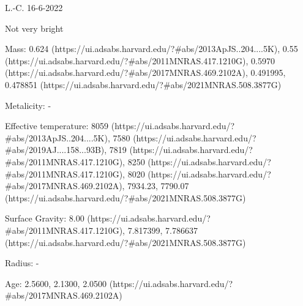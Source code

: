 L.-C.   16-6-2022

Not very bright

Mass:
0.624 (https://ui.adsabs.harvard.edu/?#abs/2013ApJS..204....5K),
0.55 (https://ui.adsabs.harvard.edu/?#abs/2011MNRAS.417.1210G),
0.5970 (https://ui.adsabs.harvard.edu/?#abs/2017MNRAS.469.2102A),
0.491995, 0.478851 (https://ui.adsabs.harvard.edu/?#abs/2021MNRAS.508.3877G)

Metalicity: -

Effective temperature:
8059 (https://ui.adsabs.harvard.edu/?#abs/2013ApJS..204....5K),
7580 (https://ui.adsabs.harvard.edu/?#abs/2019AJ....158...93B),
7819 (https://ui.adsabs.harvard.edu/?#abs/2011MNRAS.417.1210G),
8250 (https://ui.adsabs.harvard.edu/?#abs/2011MNRAS.417.1210G),
8020 (https://ui.adsabs.harvard.edu/?#abs/2017MNRAS.469.2102A),
7934.23, 7790.07 (https://ui.adsabs.harvard.edu/?#abs/2021MNRAS.508.3877G)

Surface Gravity:
8.00 (https://ui.adsabs.harvard.edu/?#abs/2011MNRAS.417.1210G),
7.817399, 7.786637 (https://ui.adsabs.harvard.edu/?#abs/2021MNRAS.508.3877G)

Radius: -

Age: 
2.5600, 2.1300, 2.0500 (https://ui.adsabs.harvard.edu/?#abs/2017MNRAS.469.2102A)












